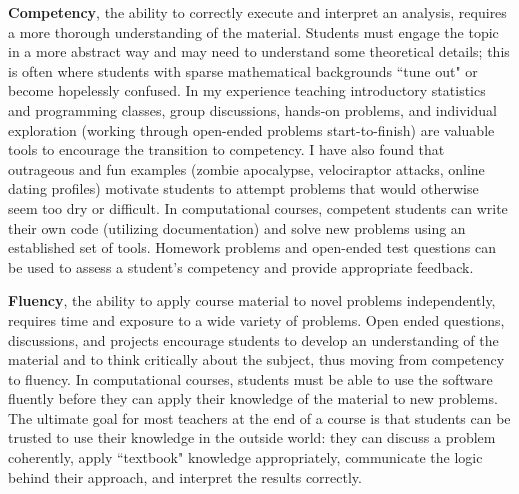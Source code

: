 \documentclass[12pt, letterpaper, sans]{moderncv}
\begin{document}
\textbf{Competency}, the ability to correctly execute and interpret an analysis, requires a more thorough understanding of the material. Students must engage the topic in a more abstract way and may need to understand some theoretical details; this is often where students with sparse mathematical backgrounds ``tune out" or become hopelessly confused. In my experience teaching introductory statistics and programming classes, group discussions, hands-on problems, and individual exploration (working through open-ended problems start-to-finish) are valuable tools to encourage the transition to competency. I have also found that outrageous and fun examples (zombie apocalypse, velociraptor attacks, online dating profiles) motivate students to attempt problems that would otherwise seem too dry or difficult. In computational courses, competent students can write their own code (utilizing documentation) and solve new problems using an established set of tools. Homework problems and open-ended test questions can be used to assess a student's competency and provide appropriate feedback.

\textbf{Fluency}, the ability to apply course material to novel problems independently, requires time and exposure to a wide variety of problems. Open ended questions, discussions, and projects encourage students to develop an understanding of the material and to think critically about the subject, thus moving from competency to fluency. In computational courses, students must be able to use the software fluently before they can apply their knowledge of the material to new problems. The ultimate goal for most teachers at the end of a course is that students can be trusted to use their knowledge in the outside world: they can discuss a problem coherently, apply ``textbook" knowledge appropriately, communicate the logic behind their approach, and interpret the results correctly.
\end{document}
